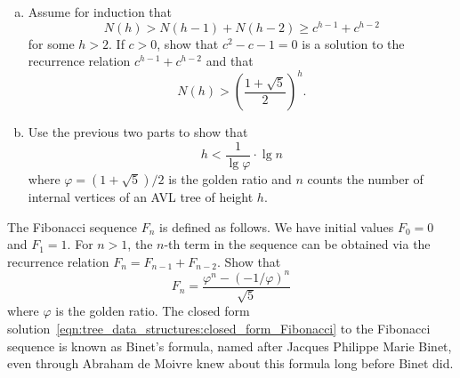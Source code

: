 \begin{problem}
\begin{enumerate}[(a)]
  \item Assume for induction that
    \[
    N(h)
    >
    N(h - 1) + N(h - 2)
    \geq
    c^{h-1} + c^{h-2}
    \]
    for some $h > 2$. If $c > 0$, show that $c^2 - c - 1 = 0$ is a
    solution to the recurrence relation
    $c^{h-1} + c^{h-2}$ and that
    \[
    N(h)
    >
    \left( \frac{1 + \sqrt{5}} {2} \right)^h.
    \]

  \item Use the previous two parts to show that
    \[
    h
    <
    \frac{1}{\lg \varphi} \cdot \lg n
    \]
    where $\varphi = (1 + \sqrt{5}) / 2$ is the
    golden ratio and $n$ counts the number of
    internal vertices of an AVL tree of height
    $h$.
  \end{enumerate}

\item The Fibonacci sequence $F_n$ is
  defined as follows. We have initial values $F_0 = 0$ and
  $F_1 = 1$. For $n > 1$, the $n$-th term in the sequence can be
  obtained via the recurrence relation
  $F_n = F_{n-1} + F_{n-2}$. Show that
  \begin{equation}
  \label{eqn:tree_data_structures:closed_form_Fibonacci}
  F_n
  =
  \frac{\varphi^n - (-1 / \varphi)^n} {\sqrt{5}}
  \end{equation}
  where $\varphi$ is the golden ratio. The closed
  form solution~\eqref{eqn:tree_data_structures:closed_form_Fibonacci}
  to the Fibonacci sequence is known as Binet's
  formula, named after Jacques Philippe Marie
  Binet, even through Abraham de
  Moivre knew about this formula long before
  Binet did.
\end{problem}
